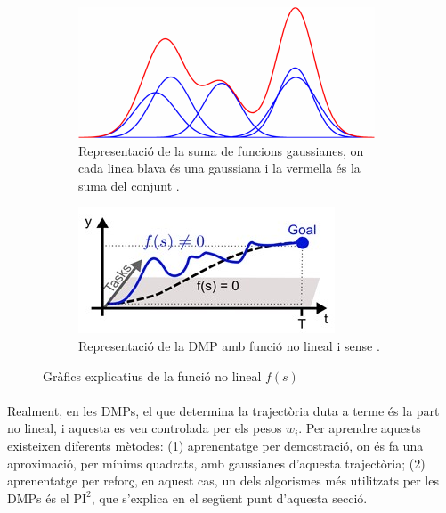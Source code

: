 \documentclass[12pt,a4paper,final,twoside]{article}
\begin{document}
\begin{figure}[h]
\centering
\begin{subfigure}[h]{0.48\textwidth}
\includegraphics[width=\textwidth]{Imatges/gaussians-sum}
\caption{Representació de la suma de funcions gaussianes, on cada linea blava és una gaussiana i la vermella és la suma del conjunt \cite{Ruckert2012}.}
\label{fig:gaussians-sum}
\end{subfigure}
\begin{subfigure}[h]{0.48\textwidth}
\includegraphics[width=\textwidth]{Imatges/DMP-with-gaussians}
\caption{Representació de la DMP amb funció no lineal i sense \cite{Ruckert2013}.}
\label{fig:DMP-with-gaussians}
\end{subfigure}
\caption{Gràfics explicatius de la funció no lineal $f(s)$}
\end{figure}

\paragraph{}Realment, en les DMPs, el que determina la trajectòria duta a terme és la part no lineal, i aquesta es veu controlada per els pesos $w_i$. Per aprendre aquests existeixen diferents mètodes: (1) aprenentatge per demostració, on és fa una aproximació, per mínims quadrats, amb gaussianes d'aquesta trajectòria; (2) aprenentatge per reforç, en aquest cas, un dels algorismes més utilitzats per les DMPs és el $\mathrm{PI^2}$, que s'explica en el següent punt d'aquesta secció.
\end{document}
